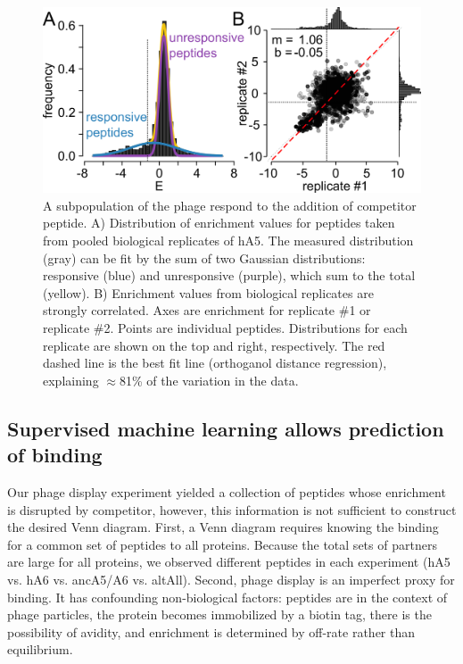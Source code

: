 \begin{figure}%
\centering
	\includegraphics{ch6-fig3.png} 
\caption[A subpopulation of phage respond to addition
of competitor]{A subpopulation of the phage respond to the addition
of competitor peptide. A) Distribution of enrichment values for peptides
taken from pooled biological replicates of hA5. The measured distribution
(gray) can be fit by the sum of two Gaussian distributions: responsive
(blue) and unresponsive (purple), which sum to the total (yellow).
B) Enrichment values from biological replicates are strongly correlated.
Axes are enrichment for replicate \#1 or replicate \#2. Points are
individual peptides. Distributions for each replicate are shown on
the top and right, respectively. The red dashed line is the best fit
line (orthoganol distance regression), explaining $\approx$81\% of the
variation in the data.\label{samplefigure}}	
\end{figure}

\subsection{Supervised machine learning allows prediction of binding}

Our phage display experiment yielded a collection of peptides whose
enrichment is disrupted by competitor, however, this information is
not sufficient to construct the desired Venn diagram. First, a Venn
diagram requires knowing the binding for a common set of peptides
to all proteins. Because the total sets of partners are large for
all proteins, we observed different peptides in each experiment (hA5
vs. hA6 vs. ancA5/A6 vs. altAll). Second, phage display is an imperfect
proxy for binding. It has confounding non-biological factors: peptides
are in the context of phage particles, the protein becomes immobilized
by a biotin tag, there is the possibility of avidity, and enrichment
is determined by off-rate rather than equilibrium. 

